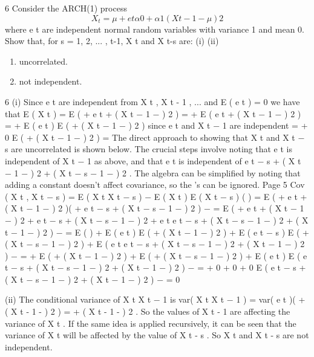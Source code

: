 \documentclass[a4paper,12pt]{article}
\begin{document}
6
Consider the ARCH(1) process
\[X_t = \mu + e t \alpha  0 + \alpha  1 ( X t − 1 − \mu ) 2\]
where e t are independent normal random variables with variance 1 and mean 0.
Show that, for s = 1, 2, ... , t-1, X t and X t-s are:
(i)
(ii)
\begin{enumerate}
\item uncorrelated.
\item not independent.
\end{enumerate}

6
(i)
Since e t are independent from X t , X t - 1 , ... and E ( e t ) = 0 we have that
E ( X t ) = E ( \mu + e t  +  ( X t − 1 − \mu ) 2 )
= \mu + E ( e t  +  ( X t − 1 − \mu ) 2 )
= \mu + E ( e t ) E (  +  ( X t − 1 − \mu ) 2 ) since e t and X t − 1 are independent
= \mu + 0 \times  E (  +  ( X t − 1 − \mu ) 2 )
=\mu
The direct approach to showing that X t and X t − s are uncorrelated is shown
below. The crucial steps involve noting that e t is independent of X t − 1 as
above, and that e t is independent of
e t − s  +  ( X t − 1 − \mu ) 2  +  ( X t − s − 1 − \mu ) 2 .
The algebra can be simplified by noting that adding a constant doesn’t affect
covariance, so the \mu ’s can be ignored.
Page 5%
Cov ( X t , X t − s ) = E ( X t X t − s ) − E ( X t ) E ( X t − s )
(
)
= E ( \mu + e t  +  ( X t − 1 − \mu ) 2 )( \mu + e t − s  +  ( X t − s − 1 − \mu ) 2 ) − 
= E (  + \mu e t  +  ( X t − 1 − \mu ) 2 + \mu e t − s  +  ( X t − s − 1 − \mu ) 2
+ e t e t − s  +  ( X t − s − 1 − \mu ) 2  +  ( X t − 1 − \mu ) 2 ) − 
= E (  ) + \mu E ( e t ) E (  +  ( X t − 1 − \mu ) 2 ) + \mu E ( e t − s ) E (  +  ( X t − s − 1 − \mu ) 2 )
+ E ( e t e t − s  +  ( X t − s − 1 − \mu ) 2  +  ( X t − 1 − \mu ) 2 ) − 
=  + \mu {} \times  E (  +  ( X t − 1 − \mu ) 2 ) + \mu {} \times  E (  +  ( X t − s − 1 − \mu ) 2 )
+ E ( e t ) E ( e t − s  +  ( X t − s − 1 − \mu ) 2  +  ( X t − 1 − \mu ) 2 ) − 
=  + 0 + 0 + 0 \times  E ( e t − s  +  ( X t − s − 1 − \mu ) 2  +  ( X t − 1 − \mu ) 2 ) − 
= 0

\newpage
(ii)
The conditional variance of X t X t − 1 is
var( X t X t − 1 ) = var( e t )(  +  ( X t - 1 - \mu ) 2 ) =  +  ( X t - 1 - \mu ) 2 .
So the values of X t - 1 are affecting the variance of X t . If the same idea is
applied recursively, it can be seen that the variance of X t will be affected by
the value of X t - s . So X t and X t - s are not independent.
\end{document}
